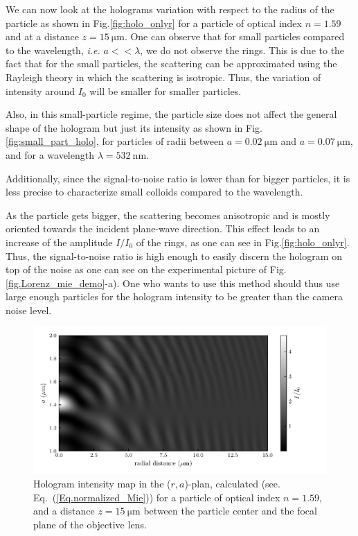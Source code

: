 We can now look at the holograms variation with respect to the radius of the particle as shown in Fig.\ref{fig:holo_onlyr} for a particle of optical index $n = 1.59$ and at a distance $z = 15 ~\mathrm{\mu m }$. One can observe that for small particles compared to the wavelength, \textit{i.e.} $a << \lambda$, we do not observe the rings. This is due to the fact that for the small particles, the scattering can be approximated using the Rayleigh theory in which the scattering is isotropic. Thus, the variation of intensity around $I_0$ will be smaller for smaller particles.

 Also, in this small-particle regime, the particle size does not affect the general shape of the hologram but just its intensity as shown in Fig.\ref{fig:small_part_holo}, for particles of radii between $a = 0.02 ~\mathrm{\mu m}$ and $a = 0.07 ~\mathrm{\mu m}$, and for a wavelength $\lambda = 532 ~\mathrm{nm}$.
 
  Additionally, since the signal-to-noise ratio is lower than for bigger particles, it is less precise to characterize small colloids compared to the wavelength.


 As the particle gets bigger, the scattering becomes anisotropic and is mostly oriented towards the incident plane-wave direction. This effect leads to an increase of the amplitude $I/I_0$ of the rings, as one can see in Fig.\ref{fig:holo_onlyr}. Thus, the signal-to-noise ratio is high enough to easily discern the hologram on top of the noise as one can see on the experimental picture of Fig.\ref{fig.Lorenz_mie_demo}-a). One who wants to use this method should thus use large enough particles for the hologram intensity to be greater than the camera noise level.



\begin{figure}[H]
	\centering
	\includegraphics{02_body/chapter2/images/holo_size_exemple/holos_only_n.pdf}
	\caption{Hologram intensity map in the ($r,a$)-plan, calculated (see. Eq.~(\ref{Eq.normalized_Mie})) for a particle of optical index $n = 1.59$, and a distance $z = 15 ~\mathrm{\mu m}$ between the particle center and the focal plane of the objective lens.}
	\label{fig:holo_onlyn}
\end{figure}



